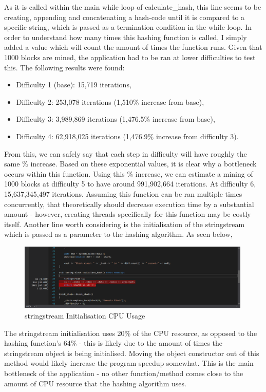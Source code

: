 \documentclass[12pt, a4paper]{article}
\begin{document}
As it is called within the main while loop of calculate\_hash, this line seems to be creating, appending and concatenating a hash-code until it is compared to a specific string, which is passed as a termination condition in the while loop. In order to understand how many times this hashing function is called, I simply added a value which will count the amount of times the function runs. Given that 1000 blocks are mined, the application had to be ran at lower difficulties to test this. The following results were found:
\begin{itemize}
\item Difficulty 1 (base): 15,719 iterations,
\item Difficulty 2: 253,078 iterations (1,510\% increase from base),
\item Difficulty 3: 3,989,869 iterations (1,476.5\% increase from base),
\item Difficulty 4: 62,918,025 iterations (1,476.9\% increase from difficulty 3).
\end{itemize}
From this, we can safely say that each step in difficulty will have roughly the same \% increase. Based on these exponential values, it is clear why a bottleneck occurs within this function. Using this \% increase, we can estimate a mining of 1000 blocks at difficulty 5 to have around 991,902,664 iterations. At difficulty 6, 15,637,345,497 iterations. Assuming this function can be ran multiple times concurrently, that theoretically should decrease execution time by a substantial amount - however, creating threads specifically for this function may be costly itself. Another line worth considering is the initialisation of the stringstream which is passed as a parameter to the hashing algorithm. As seen below, \\

\begin{figure}[H]
	\centering
		\includegraphics[width=0.99\textwidth]{"stringstreamusage"}
		\caption{stringstream Initialisation CPU Usage}
\end{figure}

The stringstream initialisation uses 20\% of the CPU resource, as opposed to the hashing function's 64\% - this is likely due to the amount of times the stringstream object is being initialised. Moving the object constructor out of this method would likely increase the program speedup somewhat. This is the main bottleneck of the application - no other function/method comes close to the amount of CPU resource that the hashing algorithm uses. 
\end{document}
